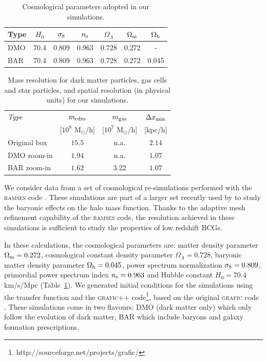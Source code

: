\documentclass[
  11pt,
  twoside,
  openright,
  titlepage,
  headings=optiontoheadandtoc
]{scrbook}
\begin{document}
\begin{table}[p]
\centering
\begin{tabular}{|l|c|c|c|c|c|c|}
\hline
\hline
 Type & $H_0$ & $\sigma_{\rm 8}$ & $n_{\rm s} $ & $\Omega_\Lambda$ & $\Omega_{\rm m}$ & $\Omega_{\rm b}$ \\
\hline
\hline
DMO & 70.4 & 0.809 & 0.963 & 0.728 & 0.272 & - \\
BAR & 70.4 & 0.809 & 0.963 & 0.728 & 0.272 & 0.045 \\
\hline
\hline
\end{tabular}
\caption{Cosmological parameters adopted in our simulations. }\label{p3:tab:cosm_par}
\end{table}

\begin{table}[p]
\centering
\begin{tabular}{|l|c|c|c|}
\hline
\hline
{\itshape Type} & $m_{\rm cdm}$&  $m_{\rm gas}$ & $\Delta x_{\rm min}$ \\
 & $[10^{8}$ M$_\odot$/h] & $[10^{7}$ M$_\odot$/h] & [kpc/h] \\
\hline
\hline      
 Original box & $ 15.5 $ & n.a. & $2.14$ \\
 DMO zoom-in & $1.94$ & n.a. & $1.07$ \\
 BAR zoom-in & $1.62$ & $3.22$ & $1.07$ \\
\hline
\hline
\end{tabular}
\caption{Mass resolution for dark matter particles, gas cells and star particles, and spatial resolution (in physical units) for our simulations. }\label{p3:tab:mass_par}
\end{table}

We consider data from a set of cosmological re-simulations performed with the {\scshape ramses} code \cite{2002A&A...385..337T}. These simulations are part of a larger set recently used 
by \cite{2014MNRAS.440.2290M} to study the baryonic effects on the halo mass function. Thanks to the adaptive mesh refinement capability of the {\scshape ramses} code, the resolution 
achieved in these simulations is sufficient to study the properties of low redshift BCGs. 

In these calculations, the cosmological parameters are: matter density parameter $\Omega_{\rm m}=0.272$, cosmological constant density parameter $\Omega_\Lambda=0.728$, baryonic matter 
density parameter $\Omega_{\rm b}=0.045$, power spectrum normalization $\sigma_{\rm 8}=0.809$, primordial power spectrum index $n_{\rm s}=0.963 $ and Hubble constant $H_0=70.4$ km/s/Mpc 
(Table~\ref{p3:tab:cosm_par}). We generated initial conditions for the simulations using the \cite{1998ApJ...496..605E} transfer function and the {\scshape grafic++} code\footnote{http://sourceforge.net/projects/grafic/}, based on the original {\scshape grafic} code \citep{2001ApJS..137....1B}. These simulations come in two flavours: DMO (dark matter only) 
which only follow the evolution of dark matter, BAR which include baryons and galaxy formation prescriptions. 
\end{document}
